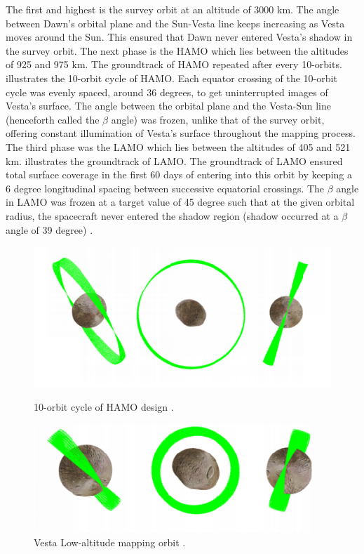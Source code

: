 The first and highest is the survey orbit at an altitude of 3000 km. The angle between Dawn's orbital plane and the Sun-Vesta line keeps increasing as Vesta moves around the Sun. This ensured that Dawn never entered Vesta's shadow in the survey orbit. The next phase is the \gls{HAMO} which lies between the altitudes of 925 and 975 km. The groundtrack of \gls{HAMO} repeated after every 10-orbits.  illustrates the 10-orbit cycle of \gls{HAMO}. Each equator crossing of the 10-orbit cycle was evenly spaced, around 36 degrees, to get uninterrupted images of Vesta's surface. The angle between the orbital plane and the Vesta-Sun line (henceforth called the $\beta$ angle) was frozen, unlike that of the survey orbit, offering constant illumination of Vesta's surface throughout the mapping process. The third phase was the \gls{LAMO} which lies between the altitudes of 405 and 521 km.  illustrates the groundtrack of \gls{LAMO}. The groundtrack of \gls{LAMO} ensured total surface coverage in the first 60 days of entering into this orbit by keeping a 6 degree longitudinal spacing between successive equatorial crossings. The $\beta$ angle in \gls{LAMO} was frozen at a target value of 45 degree such that at the given orbital radius, the spacecraft never entered the shadow region (shadow occurred at a $\beta$ angle of 39 degree) \cite{vestaorbits}.

\begin{figure}[h]
\begin{minipage}[t]{0.45\linewidth}
\centering
\includegraphics[width=\textwidth]{vestahamo.png}
\caption{10-orbit cycle of \gls{HAMO} design \cite{vestaorbits}.}
\label{fig:vestahamo}
\end{minipage}
\hspace{0.5cm}
\begin{minipage}[t]{0.45\linewidth}
\centering
\includegraphics[width=\textwidth]{vestalamo.png}
\caption{Vesta Low-altitude mapping orbit \cite{vestaorbits}.}
\label{fig:vestalamo}
\end{minipage}
\end{figure}

